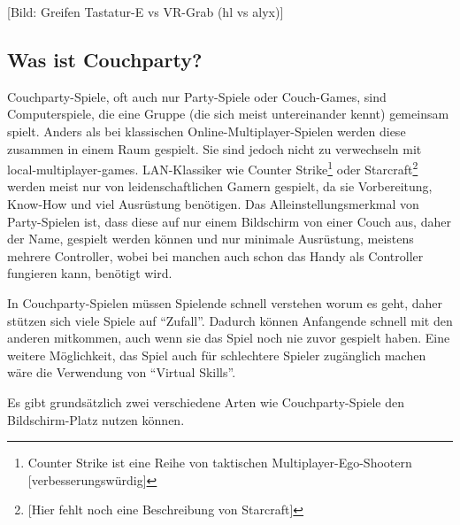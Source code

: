 [Bild: Greifen Tastatur-E vs VR-Grab (hl vs alyx)]

\subsection{Was ist Couchparty?\label{_party_games}}

Couchparty-Spiele, oft auch nur Party-Spiele oder Couch-Games, sind Computerspiele, die eine Gruppe (die sich meist untereinander kennt) gemeinsam spielt. Anders als bei klassischen Online-Multiplayer-Spielen werden diese zusammen in einem Raum gespielt. Sie sind jedoch nicht zu verwechseln mit local-multiplayer-games. LAN-Klassiker wie Counter Strike\footnote{Counter Strike ist eine Reihe von taktischen Multiplayer-Ego-Shootern [verbesserungswürdig]} oder Starcraft\footnote{[Hier fehlt noch eine Beschreibung von Starcraft]} werden meist nur von leidenschaftlichen Gamern gespielt, da sie Vorbereitung, Know-How und viel Ausrüstung benötigen. Das Alleinstellungsmerkmal von Party-Spielen ist, dass diese auf nur einem Bildschirm von einer Couch aus, daher der Name, gespielt werden können und nur minimale Ausrüstung, meistens mehrere Controller, wobei bei manchen auch schon das Handy als Controller fungieren kann, benötigt wird.

In Couchparty-Spielen müssen Spielende schnell verstehen worum es geht, daher stützen sich viele Spiele auf "`Zufall"'. Dadurch können Anfangende schnell mit den anderen mitkommen, auch wenn sie das Spiel noch nie zuvor gespielt haben. Eine weitere Möglichkeit, das Spiel auch für schlechtere Spieler zugänglich machen wäre die Verwendung von "`Virtual Skills"'\cite[S. 165]{_art_of_gamedesign}.

Es gibt grundsätzlich zwei verschiedene Arten wie Couchparty-Spiele den Bildschirm-Platz nutzen können.

